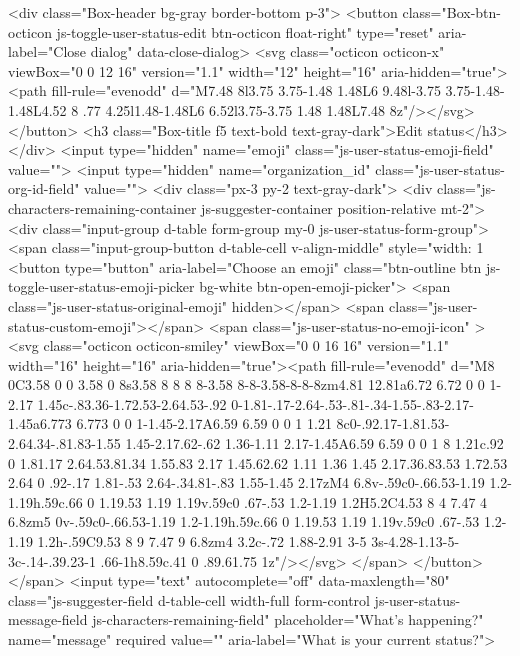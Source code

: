         <div class="Box-header bg-gray border-bottom p-3">
          <button class="Box-btn-octicon js-toggle-user-status-edit btn-octicon float-right" type="reset" aria-label="Close dialog" data-close-dialog>
            <svg class="octicon octicon-x" viewBox="0 0 12 16" version="1.1" width="12" height="16" aria-hidden="true"><path fill-rule="evenodd" d="M7.48 8l3.75 3.75-1.48 1.48L6 9.48l-3.75 3.75-1.48-1.48L4.52 8 .77 4.25l1.48-1.48L6 6.52l3.75-3.75 1.48 1.48L7.48 8z"/></svg>
          </button>
          <h3 class="Box-title f5 text-bold text-gray-dark">Edit status</h3>
        </div>
        <input type="hidden" name="emoji" class="js-user-status-emoji-field" value="">
        <input type="hidden" name="organization_id" class="js-user-status-org-id-field" value="">
        <div class="px-3 py-2 text-gray-dark">
          <div class="js-characters-remaining-container js-suggester-container position-relative mt-2">
            <div class="input-group d-table form-group my-0 js-user-status-form-group">
              <span class="input-group-button d-table-cell v-align-middle" style="width: 1%
                <button type="button" aria-label="Choose an emoji" class="btn-outline btn js-toggle-user-status-emoji-picker bg-white btn-open-emoji-picker">
                  <span class="js-user-status-original-emoji" hidden></span>
                  <span class="js-user-status-custom-emoji"></span>
                  <span class="js-user-status-no-emoji-icon" >
                    <svg class="octicon octicon-smiley" viewBox="0 0 16 16" version="1.1" width="16" height="16" aria-hidden="true"><path fill-rule="evenodd" d="M8 0C3.58 0 0 3.58 0 8s3.58 8 8 8 8-3.58 8-8-3.58-8-8-8zm4.81 12.81a6.72 6.72 0 0 1-2.17 1.45c-.83.36-1.72.53-2.64.53-.92 0-1.81-.17-2.64-.53-.81-.34-1.55-.83-2.17-1.45a6.773 6.773 0 0 1-1.45-2.17A6.59 6.59 0 0 1 1.21 8c0-.92.17-1.81.53-2.64.34-.81.83-1.55 1.45-2.17.62-.62 1.36-1.11 2.17-1.45A6.59 6.59 0 0 1 8 1.21c.92 0 1.81.17 2.64.53.81.34 1.55.83 2.17 1.45.62.62 1.11 1.36 1.45 2.17.36.83.53 1.72.53 2.64 0 .92-.17 1.81-.53 2.64-.34.81-.83 1.55-1.45 2.17zM4 6.8v-.59c0-.66.53-1.19 1.2-1.19h.59c.66 0 1.19.53 1.19 1.19v.59c0 .67-.53 1.2-1.19 1.2H5.2C4.53 8 4 7.47 4 6.8zm5 0v-.59c0-.66.53-1.19 1.2-1.19h.59c.66 0 1.19.53 1.19 1.19v.59c0 .67-.53 1.2-1.19 1.2h-.59C9.53 8 9 7.47 9 6.8zm4 3.2c-.72 1.88-2.91 3-5 3s-4.28-1.13-5-3c-.14-.39.23-1 .66-1h8.59c.41 0 .89.61.75 1z"/></svg>
                  </span>
                </button>
              </span>
              <input type="text" autocomplete="off" data-maxlength="80" class="js-suggester-field d-table-cell width-full form-control js-user-status-message-field js-characters-remaining-field" placeholder="What's happening?" name="message" required value="" aria-label="What is your current status?">
